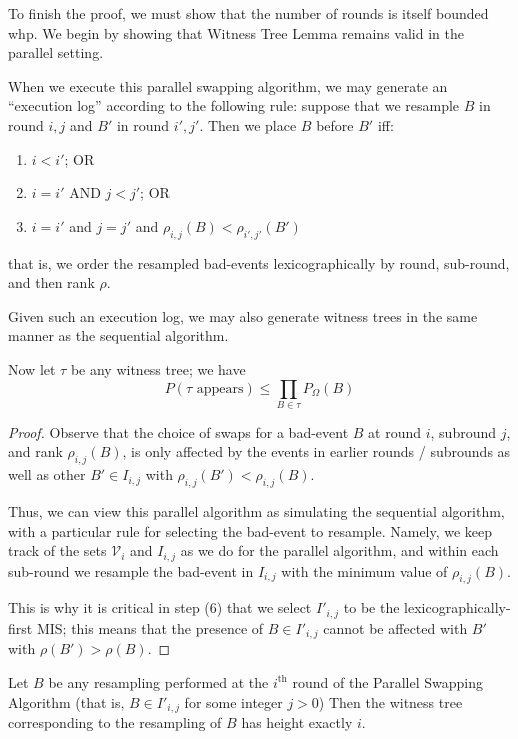 To finish the proof, we must show that the number of rounds is itself bounded whp.  We begin by showing that Witness Tree Lemma remains valid in the parallel setting.
\begin{proposition}
When we execute this parallel swapping algorithm, we may generate an ``execution log'' according to the following rule: suppose that we resample $B$ in round $i,j$ and $B'$ in round $i', j'$. Then we place $B$ before $B'$ iff:
\begin{enumerate}
\item $i < i'$; OR
\item $i = i'$ AND $j < j'$; OR
\item $i = i'$ and $j = j'$ and $\rho_{i,j}(B) < \rho_{i', j'} (B')$
\end{enumerate}
that is, we order the resampled bad-events lexicographically by round, sub-round, and then rank $\rho$.

Given such an execution log, we may also generate witness trees in the same manner as the sequential algorithm.

Now let $\tau$ be any witness tree; we have
$$
P(\text{$\tau$ appears}) \leq \prod_{B \in \tau} P_{\Omega}(B)
$$
\end{proposition}
\begin{proof}
Observe that the choice of swaps for a bad-event $B$ at round $i$, subround $j$, and rank $\rho_{i,j}(B)$, is only affected by the events in earlier rounds / subrounds as well as other $B' \in I_{i,j}$ with $\rho_{i,j}(B') < \rho_{i,j}(B)$. 

Thus, we can view this parallel algorithm as simulating the sequential algorithm, with a particular rule for selecting the bad-event to resample. Namely, we keep track of the sets $\mathcal V_i$ and $I_{i,j}$ as we do for the parallel algorithm, and within each sub-round we resample the bad-event in $I_{i,j}$ with the minimum value of $\rho_{i,j}(B)$.

This is why it is critical in step (6) that we select $I'_{i,j}$ to be the lexicographically-first MIS; this means that the presence of $B \in I'_{i,j}$ cannot be affected with $B'$ with $\rho(B') > \rho(B)$. 
\end{proof}
\begin{proposition}
Let $B$ be any resampling performed at the $i^{\text{th}}$ round of the Parallel Swapping Algorithm (that is, $B \in I'_{i,j}$ for some integer $j > 0$) Then the witness tree corresponding to the resampling of $B$ has height exactly $i$.
\end{proposition}
